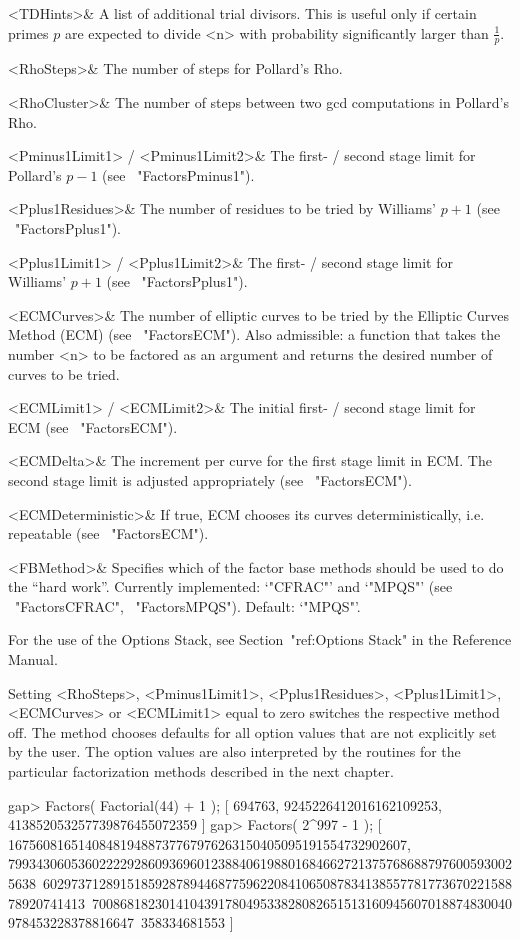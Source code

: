 \beginitems
   <TDHints>& A list of additional trial divisors.
   This is useful only if certain primes $p$ are expected to
   divide <n> with probability significantly larger than 
   $\frac{1}{p}$.

   <RhoSteps>& The number of steps for Pollard's Rho.

   <RhoCluster>& The number of steps between two
   gcd computations in Pollard's Rho.

   <Pminus1Limit1> / <Pminus1Limit2>& The first- / second stage
   limit for Pollard's $p-1$ (see ~"FactorsPminus1").

   <Pplus1Residues>& The number of residues to be tried
   by Williams' $p+1$ (see ~"FactorsPplus1").

   <Pplus1Limit1> / <Pplus1Limit2>& The first- / second stage
   limit for Williams' $p+1$ (see ~"FactorsPplus1").

   <ECMCurves>& The number of elliptic curves to be tried by the
   Elliptic Curves Method (ECM) (see ~"FactorsECM").
   Also admissible: a function that takes the number <n> to be
   factored as an argument and returns the desired number
   of curves to be tried.

   <ECMLimit1> / <ECMLimit2>& The initial first- / second stage
   limit for ECM (see ~"FactorsECM").

   <ECMDelta>& The increment per curve for the first stage limit
   in ECM. The second stage limit is adjusted appropriately
   (see ~"FactorsECM").

   <ECMDeterministic>& If true, ECM chooses its curves 
   deterministically, i.e. repeatable (see ~"FactorsECM").

   <FBMethod>& Specifies which of the factor base methods should be
   used to do the ``hard work''. Currently implemented: `"CFRAC"'
   and `"MPQS"' (see ~"FactorsCFRAC", ~"FactorsMPQS"). Default: `"MPQS"'.
\enditems

For the use of the {\GAP} Options Stack, see Section~"ref:Options Stack"
in the {\GAP} Reference Manual.

Setting <RhoSteps>, <Pminus1Limit1>, <Pplus1Residues>, <Pplus1Limit1>,
<ECMCurves> or <ECMLimit1> equal to zero switches the respective method
off. The method chooses defaults for all option values that are not
explicitly set by the user. The option values are also interpreted by
the routines for the particular factorization methods described in the
next chapter.

\beginexample
gap> Factors( Factorial(44) + 1 );
[ 694763, 9245226412016162109253, 413852053257739876455072359 ]
gap> Factors( 2^997 - 1 );
[ 167560816514084819488737767976263150405095191554732902607,
  7993430605360222292860936960123884061988016846627213757686887976005930025638\
602973712891518592878944687759622084106508783413855778177367022158878920741413\
700868182301410439178049533828082651513160945607018874830040978453228378816647\
358334681553 ]
\endexample

